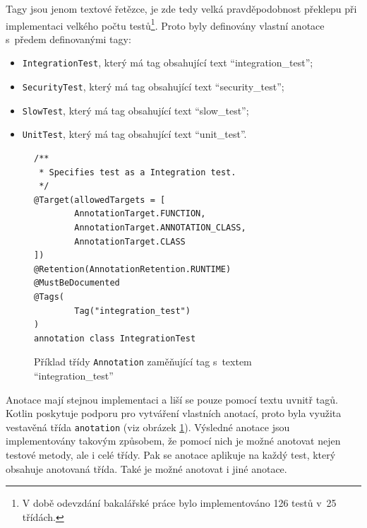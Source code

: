     Tagy jsou jenom textové řetězce, je zde tedy velká pravděpodobnost překlepu při implementaci velkého počtu testů\footnote{V době odevzdání bakalářské práce bylo implementováno 126 testů v~25 třídách.}. Proto byly definovány vlastní anotace s~předem definovanými tagy:
    \begin{itemize}
            \item \verb|IntegrationTest|, který má tag obsahující text \enquote{integration\_test};
            \item \verb|SecurityTest|, který má tag obsahující text \enquote{security\_test};
            \item \verb|SlowTest|, který má tag obsahující text \enquote{slow\_test};
            \item \verb|UnitTest|, který má tag obsahující text \enquote{unit\_test}.
    \end{itemize}
    
    \begin{figure}
        \begin{verbatim}
/**
 * Specifies test as a Integration test.
 */
@Target(allowedTargets = [
        AnnotationTarget.FUNCTION,
        AnnotationTarget.ANNOTATION_CLASS,
        AnnotationTarget.CLASS
])
@Retention(AnnotationRetention.RUNTIME)
@MustBeDocumented
@Tags(
        Tag("integration_test")
)
annotation class IntegrationTest
        \end{verbatim}
        \caption{Příklad třídy \texttt{Annotation} zaměňující tag s~textem \enquote{integration\_test}} 
        \label{code:annotation-class}
    \end{figure}
    Anotace mají stejnou implementaci a liší se pouze pomocí textu uvnitř tagů. Kotlin poskytuje podporu pro vytváření vlastních anotací, proto byla využita vestavěná třída \verb|anotation| (viz obrázek \ref{code:annotation-class}). Výsledné anotace jsou implementovány takovým způsobem, že pomocí nich je možné anotovat nejen testové metody, ale i celé třídy. Pak se anotace aplikuje na každý test, který obsahuje anotovaná třída. Také je možné anotovat i jiné anotace.

